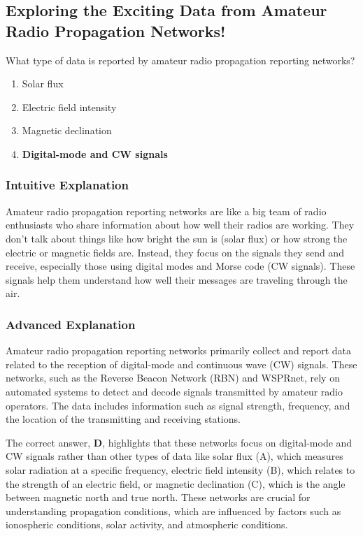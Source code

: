 \subsection{Exploring the Exciting Data from Amateur Radio Propagation Networks!}

\begin{tcolorbox}[colback=gray!10!white,colframe=black!75!black,title=E3C09] What type of data is reported by amateur radio propagation reporting networks?
    \begin{enumerate}[label=\Alph*.]
        \item Solar flux
        \item Electric field intensity
        \item Magnetic declination
        \item \textbf{Digital-mode and CW signals}
    \end{enumerate}
\end{tcolorbox}

\subsubsection{Intuitive Explanation}
Amateur radio propagation reporting networks are like a big team of radio enthusiasts who share information about how well their radios are working. They don’t talk about things like how bright the sun is (solar flux) or how strong the electric or magnetic fields are. Instead, they focus on the signals they send and receive, especially those using digital modes and Morse code (CW signals). These signals help them understand how well their messages are traveling through the air.

\subsubsection{Advanced Explanation}
Amateur radio propagation reporting networks primarily collect and report data related to the reception of digital-mode and continuous wave (CW) signals. These networks, such as the Reverse Beacon Network (RBN) and WSPRnet, rely on automated systems to detect and decode signals transmitted by amateur radio operators. The data includes information such as signal strength, frequency, and the location of the transmitting and receiving stations.

The correct answer, \textbf{D}, highlights that these networks focus on digital-mode and CW signals rather than other types of data like solar flux (A), which measures solar radiation at a specific frequency, electric field intensity (B), which relates to the strength of an electric field, or magnetic declination (C), which is the angle between magnetic north and true north. These networks are crucial for understanding propagation conditions, which are influenced by factors such as ionospheric conditions, solar activity, and atmospheric conditions.

